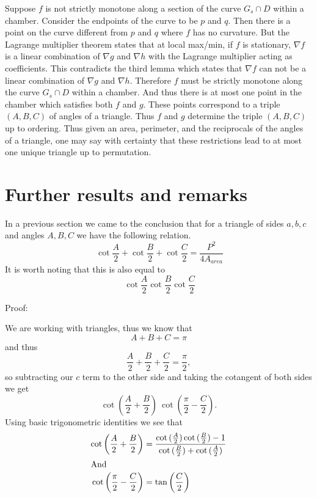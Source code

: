 \documentclass[12pt]{report}
\numberwithin{definition}{section}
\begin{document}
    
 
 Suppose $f$ is not strictly monotone along  a section of the curve $G_s \cap D$ within a chamber. Consider the endpoints of the curve to be $p$ and $q$. Then there is a point on the curve different from $p$ and $q$ where $f$ has no curvature. But the Lagrange multiplier theorem states that at local max/min, if $f$ is stationary, $ \nabla f$ is a linear combination of $ \nabla g$ and $ \nabla h$ with the Lagrange multiplier acting as coefficients. This contradicts the third lemma which states that $ \nabla f$ can not be a linear combination of $ \nabla g$ and $ \nabla h$. Therefore $f$ must be strictly monotone along the curve $G_s \cap D$ within a chamber. And thus there is at most one point in the chamber which satisfies both $f$ and $g$. These points correspond to a triple $(A, B, C)$ of angles of a triangle. Thus $f$ and $g$ determine the triple $(A, B, C)$ up to ordering. Thus given an area, perimeter, and the reciprocals of the angles of a triangle, one may say with certainty that these restrictions lead to at most one unique triangle up to permutation. 
 
 
 
 
 
 
 
 
 \break
 
 
 
 
 
 
 
 
 
 
 
 \section{ Further results and remarks}
In a previous section we came to the conclusion that for a triangle of sides $a, b, c$ and angles $A, B, C$ we have the following relation.
 \[\ \cot{\frac{A}{2}}+ \cot{\frac{B}{2}}+ \cot{\frac{C}{2}} = \frac{P^2}{4A_{area}}\]
 It is worth noting that this is also equal to 
  \[\ \cot{\frac{A}{2}} \cot{\frac{B}{2}}\cot{\frac{C}{2}} \]
  
Proof: 


   
 
 We are working with triangles, thus we know that 
 \[ A+B+C = \pi\]
 and thus 
  \[ \frac{A}{2}+\frac{B}{2}+\frac{C}{2} = \frac{\pi}{2},\]
  so subtracting our $c$ term to the other side and taking the cotangent of both sides we get 
  \[\cot{\left( \frac{A}{2}+ \frac{B}{2}\right)} \ \cot{\left(\frac{\pi}{2}- \frac{C}{2}\right)}. \]
  Using basic trigonometric identities we see that 
  \begin{align*}
       \cot{\left( \frac{A}{2}+ \frac{B}{2}\right)} &= \frac{\cot{( \frac{A}{2})}\cot{( \frac{B}{2})}-1}{\cot{( \frac{B}{2}
 )+\cot{( \frac{A}{2})}}} \\
  \intertext{And}
   \cot{\left(\frac{\pi}{2}- \frac{C}{2}\right)} &= \tan{\left( \frac{C}{2}\right)} 
  \end{align*}
 
\end{document}
